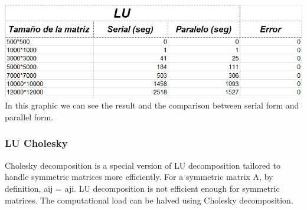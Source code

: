 \documentclass{article}
\newcounter{subsubsubsection}[subsubsection]
\begin{document}
\includegraphics[width=\linewidth]{./images/lu.png}\\
In this graphic we can see the result and the comparison between serial form and parallel form.


\subsubsection{LU Cholesky}


Cholesky decomposition is a special version of LU decomposition tailored to handle symmetric
matrices more efficiently.
For a symmetric matrix A, by definition, aij = aji. LU decomposition is not efficient enough
for symmetric matrices. The computational load can be halved using Cholesky decomposition.



\end{document}
